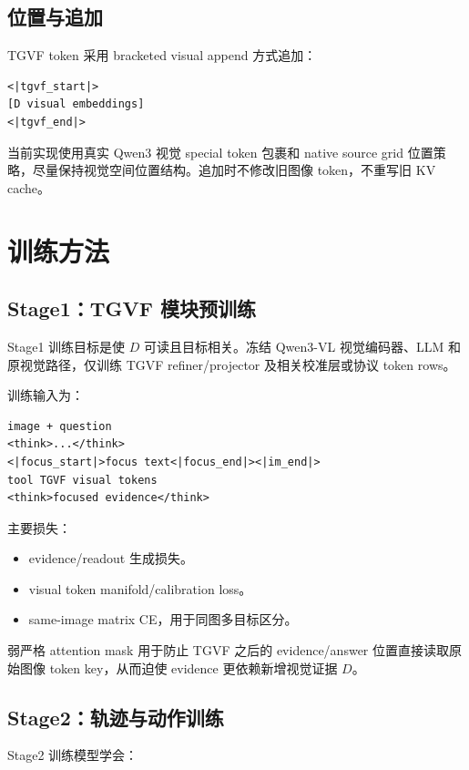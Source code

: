 \documentclass[10pt,twocolumn]{ctexart}
\begin{document}
\subsection{位置与追加}

TGVF token 采用 bracketed visual append 方式追加：

\begin{verbatim}
<|tgvf_start|>
[D visual embeddings]
<|tgvf_end|>
\end{verbatim}

当前实现使用真实 Qwen3 视觉 special token 包裹和 native source grid 位置策略，尽量保持视觉空间位置结构。追加时不修改旧图像 token，不重写旧 KV cache。

\section{训练方法}

\subsection{Stage1：TGVF 模块预训练}

Stage1 训练目标是使 $D$ 可读且目标相关。冻结 Qwen3-VL 视觉编码器、LLM 和原视觉路径，仅训练 TGVF refiner/projector 及相关校准层或协议 token rows。

训练输入为：

\begin{verbatim}
image + question
<think>...</think>
<|focus_start|>focus text<|focus_end|><|im_end|>
tool TGVF visual tokens
<think>focused evidence</think>
\end{verbatim}

主要损失：

\begin{itemize}
  \item evidence/readout 生成损失。
  \item visual token manifold/calibration loss。
  \item same-image matrix CE，用于同图多目标区分。
\end{itemize}

弱严格 attention mask 用于防止 TGVF 之后的 evidence/answer 位置直接读取原始图像 token key，从而迫使 evidence 更依赖新增视觉证据 $D$。

\subsection{Stage2：轨迹与动作训练}

Stage2 训练模型学会：
\end{document}
